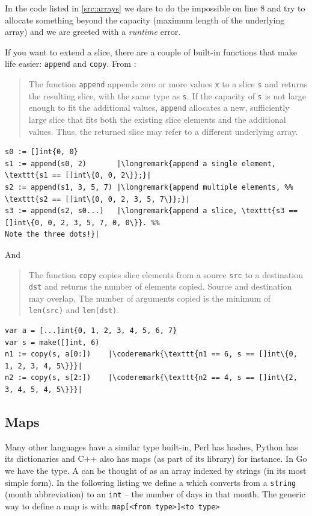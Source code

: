 In the code listed in \ref{src:arrays} we dare to do the impossible on
line 8 and try to allocate something
beyond the capacity (maximum length of the underlying array) and
we are greeted with a \emph{runtime} error.

If you want to extend a slice, there are a couple of built-in functions
that make life easier:
\lstinline{append} and \lstinline{copy}. From \cite{go_spec}:
\begin{quote}
The function \lstinline{append} appends zero or more values \lstinline{x} to a
slice \lstinline{s} and returns the resulting slice, with the same type as
\lstinline{s}.
If the capacity of \lstinline{s} is not large enough to fit the additional values,
\lstinline{append} allocates a new, sufficiently large slice that fits both the
existing slice elements and the additional values. Thus, the returned
slice may refer to a different underlying array.
\end{quote}
\begin{lstlisting}
s0 := []int{0, 0}
s1 := append(s0, 2)       |\longremark{append a single element, \texttt{s1 == []int\{0, 0, 2\}};}|
s2 := append(s1, 3, 5, 7) |\longremark{append multiple elements, %% 
\texttt{s2 == []int\{0, 0, 2, 3, 5, 7\}};}|
s3 := append(s2, s0...)   |\longremark{append a slice, \texttt{s3 == []int\{0, 0, 2, 3, 5, 7, 0, 0\}}. %%
Note the three dots!}|
\end{lstlisting}
\showremarks
And
\begin{quote}
The function \lstinline{copy} copies slice elements from a source
\lstinline{src} to a
destination \lstinline{dst} and returns the number of elements copied. Source and
destination may overlap. The number of arguments
copied is the minimum of \lstinline{len(src)} and
\mbox{\lstinline{len(dst)}}.
\end{quote}
\begin{lstlisting}
var a = [...]int{0, 1, 2, 3, 4, 5, 6, 7}
var s = make([]int, 6)
n1 := copy(s, a[0:])    |\coderemark{\texttt{n1 == 6, s == []int\{0, 1, 2, 3, 4, 5\}}}|
n2 := copy(s, s[2:])    |\coderemark{\texttt{n2 == 4, s == []int\{2, 3, 4, 5, 4, 5\}}}|
\end{lstlisting}

\subsection{Maps}
\label{sec:maps}
Many other languages have a similar type built-in, Perl has hashes,
Python has its dictionaries and C++ also has maps (as part of its library) for instance. 
In Go we have the
 type. A  can be thought of as an array indexed by
strings (in its most simple form).
In the following listing we define a  which converts from a
\lstinline{string} (month abbreviation) to an \lstinline{int} -- the number of days in that month. 
The generic way to define a map is with: \verb|map[<from type>]<to type>|

